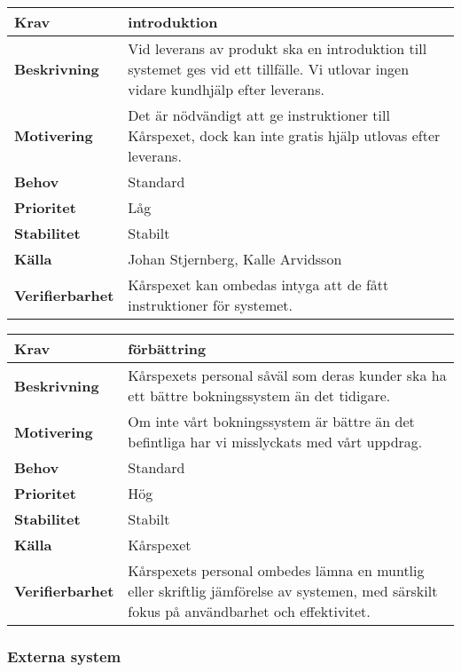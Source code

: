 \documentclass[a4paper, twoside, 11pt, titlepage]{article}
\begin{document}
		\begin{tabular} { | p{3cm} | p{12.2cm} | }
			\hline
			\textbf{Krav} & introduktion  \\
			\hline
			\textbf{Beskrivning} & Vid leverans av produkt ska en introduktion till systemet ges vid ett tillfälle. Vi utlovar ingen vidare kundhjälp efter leverans.  \\
			\hline
			\textbf{Motivering} & Det är nödvändigt att ge instruktioner till Kårspexet, dock kan inte gratis hjälp utlovas efter leverans.  \\
			\hline
			\textbf{Behov} & Standard  \\
			\hline
			\textbf{Prioritet} & Låg  \\
			\hline
			\textbf{Stabilitet} & Stabilt  \\
			\hline
			\textbf{Källa} & Johan Stjernberg, Kalle Arvidsson  \\
			\hline
			\textbf{Verifierbarhet} & Kårspexet kan ombedas intyga att de fått instruktioner för systemet.  \\
			\hline
		\end{tabular}

		\begin{tabular} { | p{3cm} | p{12.2cm} | }
			\hline
			\textbf{Krav} & förbättring  \\
			\hline
			\textbf{Beskrivning} & Kårspexets personal såväl som deras kunder ska ha ett bättre bokningssystem än det tidigare.  \\
			\hline
			\textbf{Motivering} & Om inte vårt bokningssystem är bättre än det befintliga har vi misslyckats med vårt uppdrag.  \\
			\hline
			\textbf{Behov} & Standard  \\
			\hline
			\textbf{Prioritet} & Hög  \\
			\hline
			\textbf{Stabilitet} & Stabilt  \\
			\hline
			\textbf{Källa} & Kårspexet  \\
			\hline
			\textbf{Verifierbarhet} & Kårspexets personal ombedes lämna en muntlig eller skriftlig jämförelse av systemen, med särskilt fokus på användbarhet och effektivitet.  \\
			\hline
		\end{tabular}


	\subsubsection{Externa system}
\end{document}
